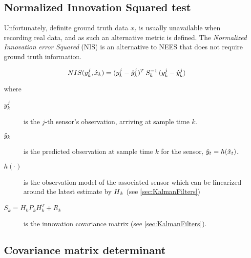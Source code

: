 \subsection{Normalized Innovation Squared test}
Unfortunately, definite ground truth data $x_t$ is usually unavailable when recording real data, and as such an alternative metric is defined. The \emph{Normalized Innovation error Squared} (NIS) is an alternative to NEES that does not require ground truth information.

\begin{equation}\label{eq:NIS}
NIS({y}^j_k,\hat{x}_k) = ({{y}}^j_k - {{\hat{{y}}}}^j_k)^T \, S_k^{-1} \, ({{y}}^j_k - {{\hat{{y}}}}^j_k)
\end{equation}

where

\begin{description}
	\item[$ {y}^j_k $] is the $j$-th sensor's observation, arriving at sample time $k$.
	\item[$ {\hat{{y}}}_k $] is the predicted observation at sample time $k$ for the  sensor, \ie $ {\hat{{y}}}_t =  h(\hat{x}_t)$.
	\item[$h(\cdot)$] is the observation model of the associated sensor which can be linearized around the latest estimate by $\begin{matrix}H\end{matrix}_k$ (see \cref{sec:KalmanFilters})
	\item[$S_k = H_k P_k H_k^T + R_k$] is the innovation covariance matrix (see \cref{sec:KalmanFilters}).
\end{description}


\subsection{Covariance matrix determinant}